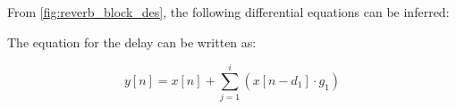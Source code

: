 From \autoref{fig:reverb_block_des}, the following differential equations can be inferred:

%
The equation for the delay can be written as:

\begin{equation}
\label{delay_eq}
y[n] = x[n] + \sum_{j=1}^{i}  (x[n- d_{1}] \cdot g_{1})
\end{equation}

%
%
%
%
%
